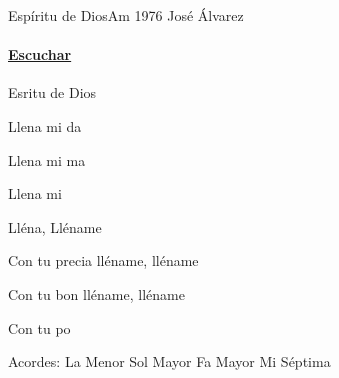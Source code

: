 \documentclass[12pt, spanish]{book}
\begin{document}
    \begin{song}{Espíritu de Dios}{Am}
        {1976} %
        {José Álvarez}
        {} %
        {}
        \ifChordBk
        \paragraph{\mbox{}\hfill\protect\href{https://open.spotify.com/intl-es/track/28QEwnCWpulPATjvBxhzJ8}{Escuchar}\mbox{}\hfill}
        \fi

        \begin{SBOpGroup}
            Esritu de Dios

            Llena mi da

            Llena mi ma

            Llena mi 
        \end{SBOpGroup}

        \begin{SBChorus}
            Lléna, Lléname

            Con tu precia lléname, lléname

            Con tu bon lléname, lléname

            Con tu po
        \end{SBChorus}

        \ifChordBk
        \begin{SBOpGroup}
            Acordes:
            \upchord{\Am}\qquad La Menor \hfill
            \upchord{\G}\qquad Sol Mayor \hfill
            \upchord{\F}\qquad Fa Mayor \hfill\null\break
            \upchord{\Eseven}\qquad Mi S\'eptima \hfill\null\break
        \end{SBOpGroup}
        \fi
    \end{song}
\end{document}
